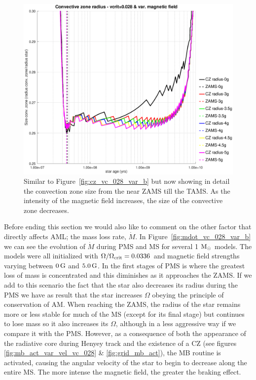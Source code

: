 \documentclass[fleqn,usenatbib]{mnras}
\begin{document}
{{\begin{figure}
	\includegraphics[trim = 30mm 15mm 20mm 15mm, clip,width=\columnwidth]{figures/cz_vc_028_var_g_z1.eps}
    \caption{Similar to Figure~\ref{fig:cz_vc_028_var_b} but now showing in detail the convection zone size from the near ZAMS till the TAMS. As the intensity of the magnetic field increases, the size of the convective zone decreases.}
    \label{fig:cz_vc_028_var_b_z1}
\end{figure}

Before ending this section we would also like to comment on the other factor that directly affects AML; the mass loss rate, $\Dot{M}$. In Figure~\ref{fig:mdot_vc_028_var_b} we can see the evolution of $\Dot{M}$ during PMS and MS for several 1 $\mathrm{M}_\odot$ models. The models were all initialized with $\Omega / \Omega_{\mathrm{crit}}=0.0336$ and magnetic field strengths varying between $0\,\mathrm{G}$ and $5.0\,\mathrm{G}$. In the first stages of PMS is where the greatest loss of mass is concentrated and this diminishes as it approaches the ZAMS. If we add to this scenario the fact that the star also decreases its radius during the PMS we have as result that the star increases $\Omega$ obeying the principle of conservation of AM. When reaching the ZAMS, the radius of the star remains more or less stable for much of the MS (except for its final stage) but continues to lose mass so it also increases its $\Omega$, although in a less aggressive way if we compare it with the PMS. However, as a consequence of both the appearance of the radiative core during Henyey track and the existence of a CZ (see figures \ref{fig:mb_act_var_vel_vc_028} \& \ref{fig:grid_mb_act}), the MB routine is activated, causing the angular velocity of the star to begin to decrease along the entire MS. The more intense the magnetic field, the greater the braking effect.\par 

}}
\end{document}
